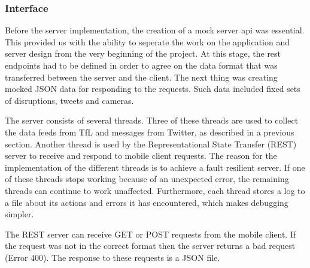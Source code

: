 \subsubsection{Interface}

Before the server implementation, the creation of a mock server api was essential. This 
provided us with the ability to seperate the work on the application and server design from the very 
beginning of the project. At this stage, the rest endpoints had to be defined in order to agree on the 
data format that was transferred between the server and the client. The next thing was creating mocked 
JSON data for responding to the requests. Such data included fixed sets of disruptions, tweets and 
cameras.

The server consists of several threads. Three of these threads are used to collect the data feeds from TfL and messages from Twitter, as described in a previous section. Another thread is used by the Representational State Transfer (REST) server to receive and respond to mobile client requests. The reason for the implementation of the different threads is to achieve a fault resilient server. If one of these threads stops working because of an unexpected error, the remaining threads can continue to work unaffected. Furthermore, each thread stores a log to a file about its actions and errors it has encountered, which makes debugging simpler.

The REST server can receive GET or POST requests from the mobile client. If the request was not in the correct format then the server returns a bad request (Error 400). The response to these requests is a JSON file. 


